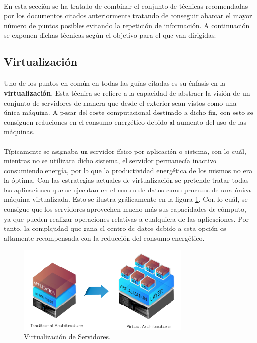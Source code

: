 \documentclass[12pt]{article}
\begin{document}
		\paragraph{}
		En esta sección se ha tratado de combinar el conjunto de técnicas recomendadas por los documentos citados anteriormente tratando de conseguir abarcar el mayor número de puntos posibles evitando la repetición de información. A continuación se exponen dichas técnicas según el objetivo para el que van dirigidas:


		\subsection{Virtualización}

			\paragraph{}
			Uno de los puntos en común en todas las guías citadas es su énfasis en la \textbf{virtualización}. Esta técnica se refiere a la capacidad de abstraer la visión de un conjunto de servidores de manera que desde el exterior sean vistos como una única máquina. A pesar del coste computacional destinado a dicho fin, con esto se consiguen reduciones en el consumo energético debido al aumento del uso de las máquinas.

			\paragraph{}
			Típicamente se asignaba un servidor físico por aplicación o sistema, con lo cuál, mientras no se utilizara dicho sistema, el servidor permanecía inactivo consumiendo energía, por lo que la productividad energética de los mismos no era la óptima. Con las estrategias actuales de virtualización se pretende tratar todas las aplicaciones que se ejecutan en el centro de datos como procesos de una única máquina virtualizada. Esto se ilustra gráficamente en la figura \ref{image:virtualization}. Con lo cuál, se consigue que los servidores aprovechen mucho más sus capacidades de cómputo, ya que pueden realizar operaciones relativas a cualquiera de las aplicaciones. Por tanto, la complejidad que gana el centro de datos debido a esta opción es altamente recompensada con la reducción del consumo energético.


			\begin{figure}[htpb!]
				\begin{center}
					\includegraphics[width=0.75\textwidth]{virtualization}
					\caption{Virtualización de Servidores.\cite{exelos:virtualization}}
					\label{image:virtualization}
				\end{center}
			\end{figure}
\end{document}
